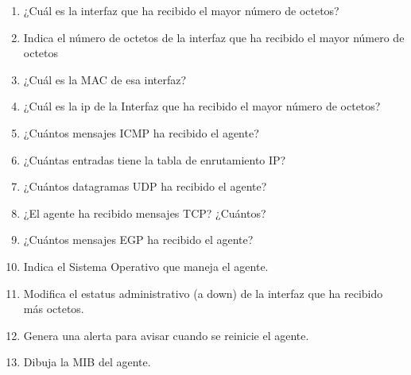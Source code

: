 \begin{enumerate}
\item ¿Cuál es la interfaz que ha recibido el mayor número de octetos?
\item Indica el número de octetos  de la interfaz que ha recibido el mayor número de octetos
\item ¿Cuál es la MAC de esa interfaz?
\item ¿Cuál es la ip de la Interfaz que ha recibido el mayor número de octetos?
\item ¿Cuántos mensajes ICMP ha recibido el agente?
\item ¿Cuántas entradas tiene la tabla de enrutamiento IP?
\item ¿Cuántos datagramas UDP ha recibido el agente?
\item ¿El agente ha recibido mensajes TCP? ¿Cuántos?
\item ¿Cuántos mensajes EGP ha recibido el agente?
\item Indica el Sistema Operativo que maneja el agente.
\item Modifica el estatus administrativo (a down) de la interfaz que ha recibido más octetos.
\item Genera una alerta para avisar cuando se reinicie el agente.
\item Dibuja la MIB del agente.
\end{enumerate}